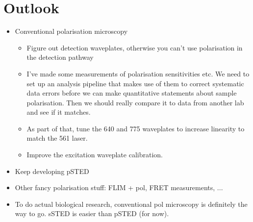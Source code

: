 
\chapter{Outlook}

\begin{itemize}
	\item Conventional polarisation microscopy
	\begin{itemize}
		\item Figure out detection waveplates, otherwise you can't use polarisation in the detection pathway
		
		\item I've made some measurements of polarisation sensitivities etc. We need to set up an analysis pipeline that makes use of them to correct systematic data errors before we can make quantitative statements about sample polarisation. Then we should really compare it to data from another lab and see if it matches.
		
		\item As part of that, tune the 640 and 775 waveplates to increase linearity to match the 561 laser.
		
		\item Improve the excitation waveplate calibration.		
	\end{itemize}

	\item Keep developing pSTED
	
	\item Other fancy polarisation stuff: FLIM + pol, FRET measurements, ...
	
	\item To do actual biological research, conventional pol microscopy is definitely the way to go. sSTED is easier than pSTED (for now).
\end{itemize}